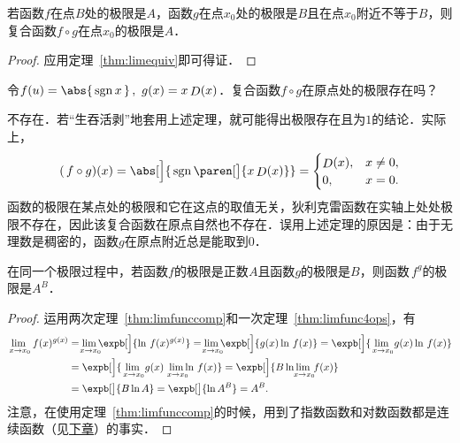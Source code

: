 \begin{theorem}[复合函数的极限]
  \label{thm:limfunccomp}
  若函数\(f\)在点\(B\)处的极限是\(A\)，函数\(g\)在点\(x_0\)处的极限是\(B\)且在点\(x_0\)附近不等于\(B\)，则复合函数\(f \circ g\)在点\(x_0\)的极限是\(A\)．

  \begin{proof}
    应用定理~\ref{thm:limequiv}即可得证．
  \end{proof}
\end{theorem}

\begin{example*}
  令\(f(u) = \abs{\,\sgn x\,}\,,\ g(x) = x \Fn D(x)\)．复合函数\(f \circ g\)在原点处的极限存在吗？

  \begin{remark}
    不存在．若“生吞活剥”地套用上述定理，就可能得出极限存在且为\(1\)的结论．实际上，
    \begin{equation*}
      (\,f \circ g)(x)
      = \abs[\Big]{\,\sgn\paren[\big]{x \Fn D(x)}} =
      \begin{cases}
        \Fn D(x), & x \ne 0, \\
        0, & x = 0.
      \end{cases}
    \end{equation*}
    函数的极限在某点处的极限和它在这点的取值无关，狄利克雷函数在实轴上处处极限不存在，因此该复合函数在原点自然也不存在．误用上述定理的原因是：由于无理数是稠密的，函数\(g\)在原点附近总是能取到\(0\)．
  \end{remark}
\end{example*}

\begin{theorem}
  \label{thm:limfuncpowexp}
  在同一个极限过程中，若函数\(f\)的极限是正数\(A\)且函数\(g\!\)的极限是\(B\)，则函数\(\,f^g\!\)的极限是\(A^B\)．

  \begin{proof}
    运用两次定理~\ref{thm:limfunccomp}和一次定理~\ref{thm:limfunc4ops}，有
    \begin{align*}
      \lim_{\,x \to x_0\!} \,f(x)^{g(x)}
      &= \smashoperator{\lim_{\,x \to x_0\!}} \expb[\Big]{\ln \,f(x)^{g(x)}}
        = \smashoperator{\lim_{\,x \to x_0\!}} \expb[\Big]{g(x) \ln \,f(x)}
        = \expb[\Big]{\lim_{\,x \to x_0\!} g(x) \ln \,f(x)} \\
      &= \expb[\Big]{\lim_{\,x \to x_0\!} g(x) \smashoperator[r]{\lim_{\,x \to x_0\!}} \ln \,f(x)}
        = \expb[\Big]{B \ln \smashoperator{\lim_{\,x \to x_0\!}} \,f(x)} \\
      &= \expb[\big]{B \ln A} = \expb[\big]{\ln A^B} = A^B.
    \end{align*}
    注意，在使用定理~\ref{thm:limfunccomp}的时候，用到了指数函数和对数函数都是连续函数（见\hyperref[ch:cont]{下章}）的事实．
  \end{proof}
\end{theorem}

